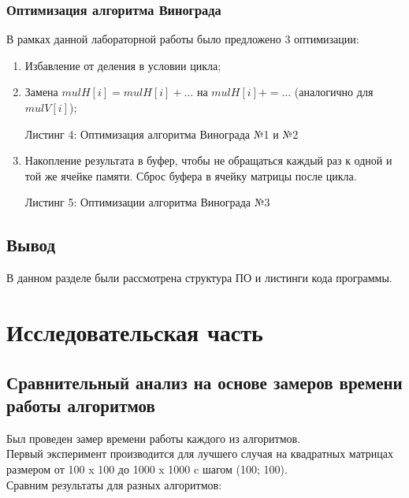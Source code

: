 \documentclass[12pt,a4paper]{article}
\begin{document}
\subsubsection{Оптимизация алгоритма Винограда}
В рамках данной лабораторной работы было предложено 3 оптимизации:
\begin{enumerate}
	\item Избавление от деления в условии цикла;
	\item Замена $mulH[i] = mulH[i] + …$ на $mulH[i] += …$ (аналогично для $mulV[i]$);
\begin{flushleft}
	Листинг 4: Оптимизация алгоритма Винограда №1 и №2
	
\end{flushleft}

	\item Накопление результата в буфер, чтобы не обращаться каждый раз к одной и той же ячейке памяти. Сброс буфера в ячейку матрицы после цикла.
\begin{flushleft}
	Листинг 5: Оптимизации алгоритма Винограда №3
	
\end{flushleft}
\end{enumerate}

\subsection{Вывод}
В данном разделе были рассмотрена структура ПО и листинги кода программы.
\clearpage

\section{Исследовательская часть}
\subsection{Сравнительный анализ на основе замеров времени работы алгоритмов}
Был проведен замер времени работы каждого из алгоритмов.\\
Первый эксперимент производится для лучшего случая на квадратных матрицах размером от 100 x 100 до 1000 x 1000 c шагом (100; 100).\\
Сравним результаты для разных алгоритмов:
\end{document}
